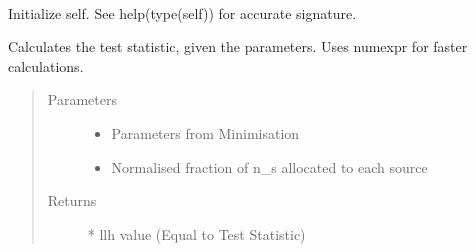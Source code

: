 \documentclass[letterpaper,10pt,english]{sphinxmanual}
\begin{document}
\begin{fulllineitems}
\label{\detokenize{index:flarestack.core.llh.StandardLLH}}~

\begin{fulllineitems}
\label{\detokenize{index:flarestack.core.llh.StandardLLH.__init__}}
Initialize self.  See help(type(self)) for accurate signature.

\end{fulllineitems}


\begin{fulllineitems}
\label{\detokenize{index:flarestack.core.llh.StandardLLH.calculate_test_statistic}}
Calculates the test statistic, given the parameters. Uses numexpr
for faster calculations.
\begin{quote}\begin{description}
\item[{Parameters}] \leavevmode\begin{itemize}
\item {} 
 \textendash{} Parameters from Minimisation

\item {} 
 \textendash{} Normalised fraction of n\_s allocated to each source

\end{itemize}

\item[{Returns}]  * llh value (Equal to Test Statistic)

\end{description}\end{quote}


\end{fulllineitems}
\end{fulllineitems}
\end{document}
